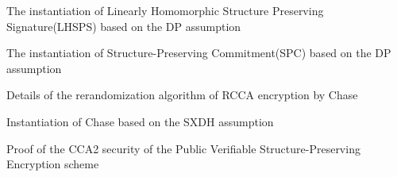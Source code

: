 \documentclass[11pt]{article}
\begin{document}
\begin{appendices}
  
  \begin{section}{The instantiation of Linearly Homomorphic Structure Preserving Signature(LHSPS) based on the DP assumption}
    
  \end{section}

  \begin{section}{The instantiation of Structure-Preserving Commitment(SPC) based on the DP assumption}
    \label{SPC}
    
  \end{section}
  
  
  \begin{section}{Details of the rerandomization algorithm of RCCA encryption by Chase \etal~\cite{DBLP:conf/eurocrypt/ChaseKLM12}}
    \label{Rerandomization}
    
  \end{section}
  
\begin{section}{Instantiation of Chase \etal based on the SXDH assumption}
  \label{chaseSXDH}
  
\end{section}

\begin{section}{Proof of the CCA2 security of the Public Verifiable Structure-Preserving Encryption scheme}
  \label{ProofSPPE}
  
\end{section}

\end{appendices}
\end{document}
